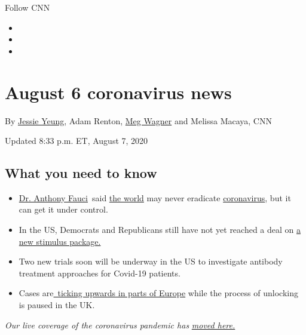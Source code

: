 Follow CNN

\begin{itemize}
\item
\item
\item
\end{itemize}

\hypertarget{august-6-coronavirus-news}{%
\section{August 6 coronavirus news}\label{august-6-coronavirus-news}}

By \href{/profiles/jessie-yeung}{Jessie Yeung}, Adam Renton,
\href{/profiles/meg-wagner}{Meg Wagner} and Melissa Macaya, CNN

Updated 8:33 p.m. ET, August 7, 2020

\hypertarget{what-you-need-to-know}{%
\subsection{What you need to know}\label{what-you-need-to-know}}

\begin{itemize}
\tightlist
\item
  \href{https://edition.cnn.com/2020/08/06/health/us-coronavirus-thursday/index.html}{Dr.
  Anthony Fauci}~said
  \href{https://edition.cnn.com/interactive/2020/health/coronavirus-maps-and-cases/}{the
  world} may never eradicate
  \href{https://edition.cnn.com/specials/world/coronavirus-outbreak-intl-hnk}{coronavirus},
  but it can get it under control.
\item
  In the US, Democrats and Republicans still have not yet reached a deal
  on
  \href{https://www.cnn.com/2020/08/05/politics/congress-stimulus-negotiations/index.html}{a
  new stimulus package.}
\item
  Two new trials soon will be underway in the US to investigate antibody
  treatment approaches for Covid-19 patients.
\item
  Cases
  are\href{https://cnn.com/2020/07/28/europe/europe-coronavirus-resurgence-intl/index.html}{~ticking
  upwards in parts of Europe} while the process of unlocking is paused
  in the UK.
\end{itemize}

\emph{Our live coverage of the coronavirus pandemic has}
\href{http://www.cnn.com/world/live-news/coronavirus-pandemic-08-07-20-intl/index.html}{\emph{moved
here.}}

